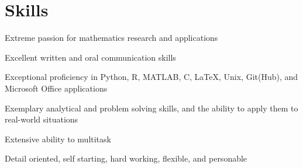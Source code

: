 \documentclass[letterpaper]{deedy-resume} %
\begin{document}
\begin{minipage}[t]{0.33\textwidth}

\vspace{25pt}

\section{Skills}
\vspace{\topsep}
\begin{tightitemize}
    \item Extreme passion for mathematics research and applications
    \item Excellent written and oral communication skills
    \item Exceptional proficiency in Python, R, MATLAB, C, \LaTeX, Unix, Git(Hub), and Microsoft Office applications
    \item Exemplary analytical and problem solving skills, and the ability to apply them to real-world situations
    \item Extensive ability to multitask
    \item Detail oriented, self starting, hard working, flexible, and personable
\end{tightitemize}



\end{minipage} %
\hfill
%
%
\end{document}
